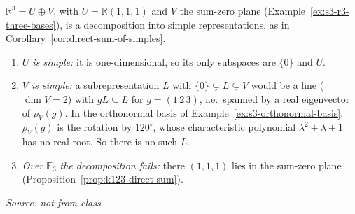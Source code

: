 \documentclass[11pt]{report}
\newcommand{\srcline}[1]{\par\hfill{\footnotesize\textit{Source: #1}}}
\begin{document}
\begin{exbox}\label{ex:s3-r3-simples}
$\mathbb{R}^3 = U \oplus V$, with $U = \mathbb{R}(1,1,1)$ and $V$ the sum-zero plane (Example~\ref{ex:s3-r3-three-bases}), is a decomposition into simple representations, as in Corollary~\ref{cor:direct-sum-of-simples}.
\begin{enumerate}
    \item \emph{$U$ is simple:} it is one-dimensional, so its only subspaces are $\{0\}$ and $U$.
    \item \emph{$V$ is simple:} a subrepresentation $L$ with $\{0\} \subsetneq L \subsetneq V$ would be a line ($\dim V = 2$) with $gL \subseteq L$ for $g = (1\,2\,3)$, i.e.\ spanned by a real eigenvector of $\rho_V(g)$. In the orthonormal basis of Example~\ref{ex:s3-orthonormal-basis}, $\rho_V(g)$ is the rotation by $120^\circ$, whose characteristic polynomial $\lambda^2 + \lambda + 1$ has no real root. So there is no such $L$.
    \item \emph{Over $\mathbb{F}_3$ the decomposition fails:} there $(1,1,1)$ lies in the sum-zero plane (Proposition~\ref{prop:k123-direct-sum}).
\end{enumerate}
\srcline{not from class}
\end{exbox}
\end{document}
